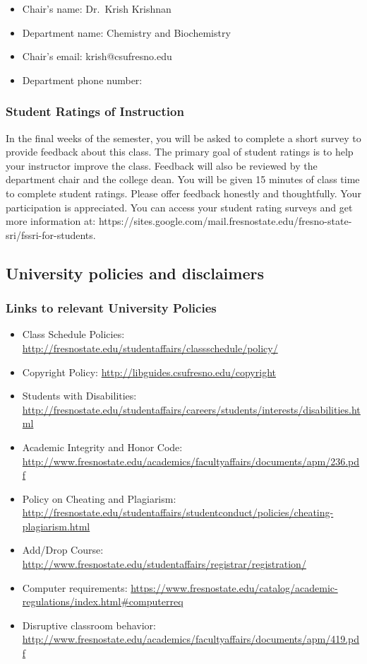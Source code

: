 \begin{itemize}
\tightlist
\item
  Chair's name: Dr.~Krish Krishnan
\item
  Department name: Chemistry and Biochemistry
\item
  Chair's email: krish@csufresno.edu
\item
  Department phone number:
\end{itemize}

\subsubsection{Student Ratings of
Instruction}\label{student-ratings-of-instruction}

In the final weeks of the semester, you will be asked to complete a
short survey to provide feedback about this class. The primary goal of
student ratings is to help your instructor improve the class. Feedback
will also be reviewed by the department chair and the college dean. You
will be given 15 minutes of class time to complete student ratings.
Please offer feedback honestly and thoughtfully. Your participation is
appreciated. You can access your student rating surveys and get more
information at:
https://sites.google.com/mail.fresnostate.edu/fresno-state-sri/fssri-for-students.

\subsection{University policies and
disclaimers}\label{university-policies-and-disclaimers}

\subsubsection{Links to relevant University
Policies}\label{links-to-relevant-university-policies}

\begin{itemize}
\tightlist
\item
  Class Schedule Policies:
  \url{http://fresnostate.edu/studentaffairs/classschedule/policy/}
\item
  Copyright Policy: \url{http://libguides.csufresno.edu/copyright}
\item
  Students with Disabilities:
  \url{http://fresnostate.edu/studentaffairs/careers/students/interests/disabilities.html}
\item
  Academic Integrity and Honor Code:
  \url{http://www.fresnostate.edu/academics/facultyaffairs/documents/apm/236.pdf}
\item
  Policy on Cheating and Plagiarism:
  \url{http://fresnostate.edu/studentaffairs/studentconduct/policies/cheating-plagiarism.html}
\item
  Add/Drop Course:
  \url{http://www.fresnostate.edu/studentaffairs/registrar/registration/}
\item
  Computer requirements:
  \url{https://www.fresnostate.edu/catalog/academic-regulations/index.html#computerreq}
\item
  Disruptive classroom behavior:
  \url{http://www.fresnostate.edu/academics/facultyaffairs/documents/apm/419.pdf}
\end{itemize}

